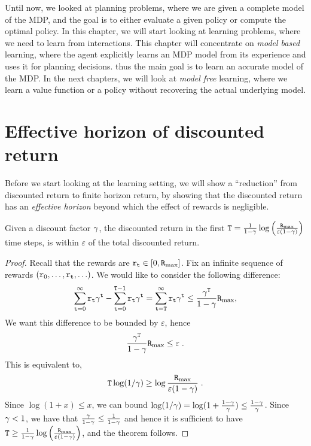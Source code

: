 Until now, we looked at planning problems, where we are given a
complete model of the MDP, and the goal is to either evaluate a
given policy or compute the optimal policy. In this chapter, we will
start looking at learning problems, where we need to learn from
interactions. This chapter will concentrate on {\em model based}
learning, where the agent explicitly learns an MDP model
from its experience and uses it for planning decisions.
thus the main goal is to learn an accurate model of the
MDP. In the next chapters, we will look at {\em model
free} learning, where we learn a value function or a policy without
recovering the actual underlying model.

\section{Effective horizon of discounted return}

Before we start looking at the learning setting, we will show a
``reduction'' from discounted return to finite horizon return, 
by showing that the discounted return has an {\em
effective horizon} beyond
which the effect of rewards is negligible.

\begin{theorem}
\label{thm:disc-effective-horizon}
%
Given a discount factor $\gamma$, the discounted
return in the first ${\tt T}=\frac{1}{1-\gamma}\log
\left(\frac{{\tt R}_{\max }}{\varepsilon(1-\gamma)} \right)$ time steps, is within
$\varepsilon$ of the total discounted return.
\end{theorem}

\begin{proof}
Recall that the rewards are ${\tt r}_{\tt t} \in [0,{\tt R}_{\max }]$. Fix an
infinite sequence of rewards $({\tt r}_0, \ldots , {\tt r}_{\tt t},
\ldots)$. We would like to consider the following difference:
\begin{align*}
\sum_{{\tt t}=0}^\infty {\tt r}_{\tt t} \gamma^{\tt t} -
\sum_{{\tt t}=0}^{{\tt T}-1} {\tt r}_{\tt t} \gamma^{\tt t} =
\sum_{{\tt t}={\tt T}}^\infty {\tt r}_{\tt t} \gamma^{\tt t} \leq
\frac{\gamma^{\tt T}}{1-\gamma}{\tt R}_{\max },
\end{align*}
We want this difference to be bounded by $\varepsilon$, hence
\[
\frac{\gamma^{\tt T}}{1-\gamma}{\tt R}_{\max }\leq \varepsilon\;.
\]
This is equivalent to,
\[
{\tt T}\log (1/\gamma) \geq \log
\frac{{\tt R}_{\max }}{\varepsilon(1-\gamma)}\;.
\]
Since $\log(1+x)\leq x$, we can bound $\log (1/\gamma)= \log (
1+\frac{1-\gamma}{\gamma} )\leq
\frac{1-\gamma}{\gamma}$. Since $\gamma< 1$, we have that
$\frac{\gamma}{1-\gamma} \leq \frac{1}{1-\gamma}$ and hence
it is sufficient to have ${\tt T}\geq \frac{1}{1-\gamma}\log\left(
\frac{{\tt R}_{\max }}{\varepsilon(1-\gamma)}\right) $, and the theorem follows.
\end{proof}

